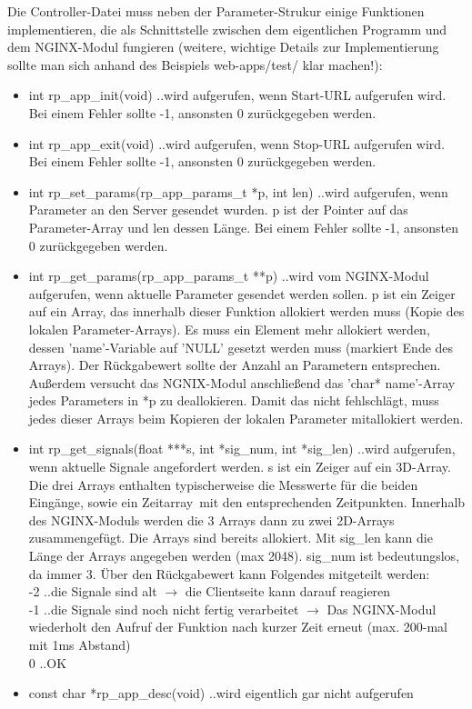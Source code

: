 \documentclass[11pt]{scrartcl}
\begin{document}
Die Controller-Datei muss neben der Parameter-Strukur einige Funktionen implementieren, die als Schnittstelle zwischen dem eigentlichen Programm und dem NGINX-Modul fungieren (weitere, wichtige Details zur Implementierung sollte man sich anhand des Beispiels web-apps/test/ klar machen!):
\begin{itemize}
\item int rp\_app\_init(void) ..wird aufgerufen, wenn Start-URL aufgerufen wird. Bei einem Fehler sollte -1, ansonsten 0 zurückgegeben werden.
\item int rp\_app\_exit(void) ..wird aufgerufen, wenn Stop-URL aufgerufen wird. Bei einem Fehler sollte -1, ansonsten 0 zurückgegeben werden.
\item int rp\_set\_params(rp\_app\_params\_t *p, int len) ..wird aufgerufen, wenn Parameter an den Server gesendet wurden. p ist der Pointer auf das Parameter-Array und len dessen Länge. Bei einem Fehler sollte -1, ansonsten 0 zurückgegeben werden.
\item int rp\_get\_params(rp\_app\_params\_t **p) ..wird vom NGINX-Modul aufgerufen, wenn aktuelle Parameter gesendet werden sollen. p ist ein Zeiger auf ein Array, das innerhalb dieser Funktion allokiert werden muss (Kopie des lokalen Parameter-Arrays). Es muss ein Element mehr allokiert werden, dessen 'name'-Variable auf 'NULL' gesetzt werden muss (markiert Ende des Arrays). Der Rückgabewert sollte der Anzahl an Parametern entsprechen. Außerdem versucht das NGNIX-Modul anschließend das 'char* name'-Array jedes Parameters in *p zu deallokieren. Damit das nicht fehlschlägt, muss jedes dieser Arrays beim Kopieren der lokalen Parameter mitallokiert werden.
\item int rp\_get\_signals(float ***s, int *sig\_num, int *sig\_len) ..wird aufgerufen, wenn aktuelle Signale angefordert werden. s ist ein Zeiger auf ein 3D-Array. Die drei Arrays enthalten typischerweise die Messwerte für die beiden Eingänge, sowie ein \grqq Zeitarray\grqq~mit den entsprechenden Zeitpunkten. Innerhalb des NGINX-Moduls werden die 3 Arrays dann zu zwei 2D-Arrays zusammengefügt. Die Arrays sind bereits allokiert. Mit sig\_len kann die Länge der Arrays angegeben werden (max 2048). sig\_num ist bedeutungslos, da immer 3. Über den Rückgabewert kann Folgendes mitgeteilt werden:\\
-2 ..die Signale sind alt $\to$ die Clientseite kann darauf reagieren\\
-1 ..die Signale sind noch nicht fertig verarbeitet $\to$ Das NGINX-Modul wiederholt den Aufruf der Funktion nach kurzer Zeit erneut (max. 200-mal mit 1ms Abstand)\\
0  ..OK
\item const char *rp\_app\_desc(void) ..wird eigentlich gar nicht aufgerufen
\end{itemize} 
\end{document}
